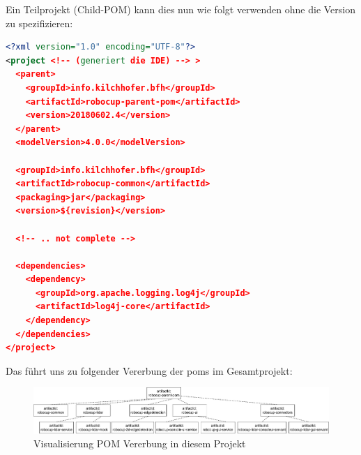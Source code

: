 Ein Teilprojekt (Child-POM) kann dies nun wie folgt verwenden ohne die Version zu spezifizieren:
\begin{lstlisting}[language=XML, caption={Ausschnitt aus dem Child-POM},label={lst:maven-child-pom}]
<?xml version="1.0" encoding="UTF-8"?>
<project <!-- (generiert die IDE) --> >
  <parent>
    <groupId>info.kilchhofer.bfh</groupId>
    <artifactId>robocup-parent-pom</artifactId>
    <version>20180602.4</version>
  </parent>
  <modelVersion>4.0.0</modelVersion>

  <groupId>info.kilchhofer.bfh</groupId>
  <artifactId>robocup-common</artifactId>
  <packaging>jar</packaging>
  <version>${revision}</version>
  
  <!-- .. not complete -->
      
  <dependencies>
    <dependency>
      <groupId>org.apache.logging.log4j</groupId>
      <artifactId>log4j-core</artifactId>
    </dependency>
  </dependencies>
</project>
\end{lstlisting}
Das führt uns zu folgender Vererbung der \acrshort{pom}s im Gesamtprojekt:
\begin{figure}[H]
	\centering
	\includegraphics[width=1.0\textwidth]{img/maven-pom-inheritance-robocup.pdf}
	\caption{Visualisierung POM Vererbung in diesem Projekt}
	\label{fig:grundlagen-pom-vererbung-robocup}
\end{figure}


